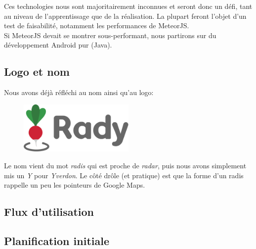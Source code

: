 \documentclass[french]{article}
\begin{document}
			Ces technologies nous sont majoritairement inconnues et seront donc un défi, tant au niveau de l'apprentissage que de la réalisation. La plupart feront l'objet d'un test de faisabilité, notamment les performances de MeteorJS.\\
			
			Si MeteorJS devait se montrer sous-performant, nous partirons sur du développement Android pur (Java).
			
		\subsection{Logo et nom}
			Nous avons déjà réfléchi au nom ainsi qu'au logo:
			\begin{figure}[H]
				\centering
				\includegraphics[width=0.5\textwidth]{../logo/logo}
			\end{figure}
			Le nom vient du mot \textit{radis} qui est proche de \textit{radar}, puis nous avons simplement mis un \textit{Y} pour \textit{Yverdon}. Le côté drôle (et pratique) est que la forme d'un radis rappelle un peu les pointeurs de Google Maps.
		
		\subsection{Flux d'utilisation}
		\label{subsec:userflow}
		
		\subsection{Planification initiale}
			
\end{document}
